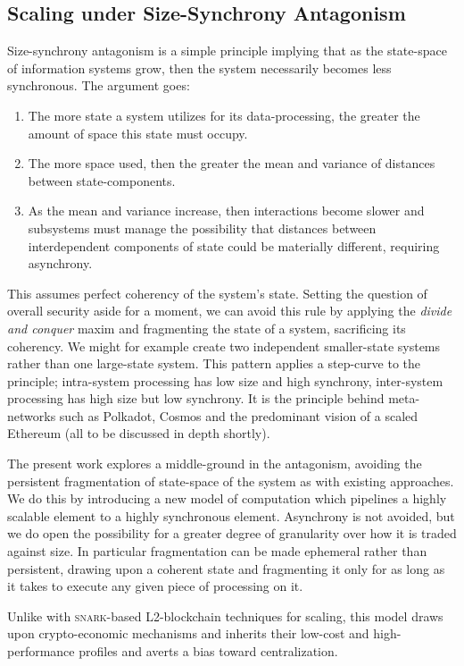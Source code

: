 \subsection{Scaling under Size-Synchrony Antagonism}

Size-synchrony antagonism is a simple principle implying that as the state-space of information systems grow, then the system necessarily becomes less synchronous. The argument goes:

\begin{enumerate}
  \item The more state a system utilizes for its data-processing, the greater the amount of space this state must occupy.
  \item The more space used, then the greater the mean and variance of distances between state-components.
  \item As the mean and variance increase, then interactions become slower and subsystems must manage the possibility that distances between interdependent components of state could be materially different, requiring asynchrony.
\end{enumerate}

This assumes perfect coherency of the system's state. Setting the question of overall security aside for a moment, we can avoid this rule by applying the \emph{divide and conquer} maxim and fragmenting the state of a system, sacrificing its coherency. We might for example create two independent smaller-state systems rather than one large-state system. This pattern applies a step-curve to the principle; intra-system processing has low size and high synchrony, inter-system processing has high size but low synchrony. It is the principle behind meta-networks such as Polkadot, Cosmos and the predominant vision of a scaled Ethereum (all to be discussed in depth shortly).

The present work explores a middle-ground in the antagonism, avoiding the persistent fragmentation of state-space of the system as with existing approaches. We do this by introducing a new model of computation which pipelines a highly scalable element to a highly synchronous element. Asynchrony is not avoided, but we do open the possibility for a greater degree of granularity over how it is traded against size. In particular fragmentation can be made ephemeral rather than persistent, drawing upon a coherent state and fragmenting it only for as long as it takes to execute any given piece of processing on it.

Unlike with \textsc{snark}-based L2-blockchain techniques for scaling, this model draws upon crypto-economic mechanisms and inherits their low-cost and high-performance profiles and averts a bias toward centralization.

